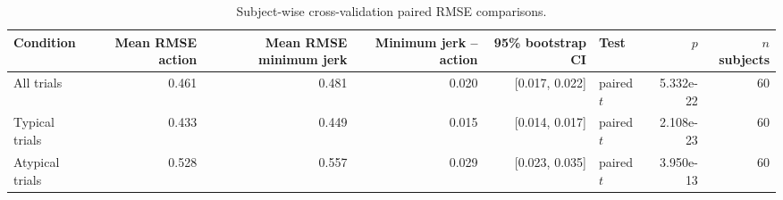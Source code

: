 \begin{table}[htbp]
\centering
\small
\caption{Subject-wise cross-validation paired RMSE comparisons.}
\label{tab:subject-cv-paired}
\begin{tabular}{lrrrrlrr}
\toprule
Condition & Mean RMSE action & Mean RMSE minimum jerk & Minimum jerk -- action & 95\% bootstrap CI & Test & $p$ & $n$ subjects \\
\midrule
All trials & 0.461 & 0.481 & 0.020 & [0.017, 0.022] & paired $t$ & 5.332e-22 & 60 \\
Typical trials & 0.433 & 0.449 & 0.015 & [0.014, 0.017] & paired $t$ & 2.108e-23 & 60 \\
Atypical trials & 0.528 & 0.557 & 0.029 & [0.023, 0.035] & paired $t$ & 3.950e-13 & 60 \\
\bottomrule
\end{tabular}
\end{table}
